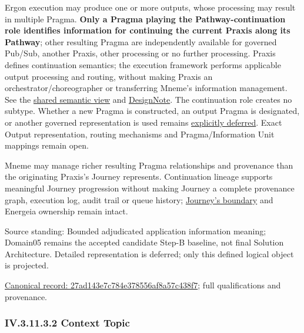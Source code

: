 Ergon execution may produce one or more outputs, whose processing may result in
multiple Pragma. \textbf{Only a Pragma playing the Pathway-continuation role identifies
information for continuing the current Praxis along its Pathway}; other resulting
Pragma are independently available for governed Pub/Sub, another Praxis, other
processing or no further processing. Praxis defines continuation semantics;
the execution framework performs applicable output processing and routing,
without making Praxis an orchestrator/choreographer or transferring Mneme's
information management. See the \hyperref[element:27ad143e7c784e378556af8a57c438f7]{shared semantic view}
and \href{\detokenize{../../../../../docs/markdown/05-information-systems-architecture/design-notes/DesignNote-Pragma-Outputs-and-Pathway-Continuation.md}}{DesignNote}.
The continuation role creates no subtype. Whether a new Pragma is constructed,
an output Pragma is designated, or another governed representation is used remains
\href{\detokenize{../../../../../docs/markdown/05-information-systems-architecture/gaps.md#continuation-representation}}{explicitly deferred}. Exact Output
representation, routing mechanisms and Pragma/Information Unit mappings remain open.



Mneme may manage richer resulting Pragma relationships and provenance than the
originating Praxis's Journey represents. Continuation lineage supports meaningful
Journey progression without making Journey a complete provenance graph, execution
log, audit trail or queue history; \hyperref[element:359b901df27f4b43b5a2ff14a8484e34]{Journey's boundary}
and Energeia ownership remain intact.



Source standing: Bounded adjudicated application information meaning; Domain05 remains the accepted candidate Step-B baseline, not final Solution Architecture. Detailed representation is deferred; only this defined logical object is projected.


{\footnotesize \href{../../../../continuum/application/data-object/27ad143e7c784e378556af8a57c438f7.md}{Canonical record: 27ad143e7c784e378556af8a57c438f7}; full qualifications and provenance.}\par
\subsubsection*{IV.3.11.3.2 Context Topic}
\label{navigation:IV.3.11.3.2}

